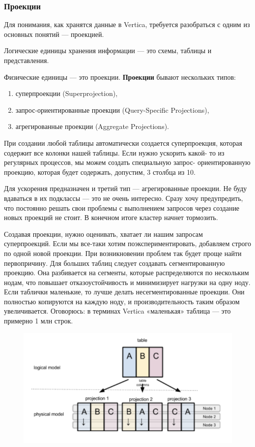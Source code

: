 \subsubsection{Проекции}

Для понимания, как хранятся данные в Vertica, требуется разобраться с
одним из основных понятий — проекцией.

Логические единицы хранения информации — это схемы, таблицы и
представления.

Физические единицы — это проекции. \textbf{Проекции} бывают нескольких типов:

\begin{enumerate}
	\item суперпроекции (Superprojection),
	\item запрос-ориентированные проекции (Query-Specific Projections),
	\item агрегированные проекции (Aggregate Projections).
\end{enumerate}

При создании любой таблицы автоматически создается суперпроекция,
которая содержит все колонки нашей таблицы. Если нужно ускорить какой-
то из регулярных процессов, мы можем создать специальную запрос-
ориентированную проекцию, которая будет содержать, допустим, 3 столбца
из 10.

Для ускорения предназначен и третий тип — агрегированные проекции. Не
буду вдаваться в их подклассы — это не очень интересно. Сразу хочу
предупредить, что постоянно решать свои проблемы с выполнением
запросов через создание новых проекций не стоит. В конечном итоге
кластер начнет тормозить.

Создавая проекции, нужно оценивать, хватает ли нашим запросам
суперпроекций. Если мы все-таки хотим поэкспериментировать, добавляем
строго по одной новой проекции. При возникновении проблем так будет
проще найти первопричину. Для больших таблиц следует создавать
сегментированную проекцию. Она разбивается на сегменты, которые
распределяются по нескольким нодам, что повышает отказоустойчивость и
минимизирует
нагрузки на одну ноду. Если таблички маленькие, то лучше делать
несегментированные
проекции. Они полностью копируются на каждую ноду, и
производительность таким образом увеличивается. Оговорюсь: в терминах
Vertica «маленькая» таблица — это примерно 1 млн строк.

\begin{figure}[ht!]
	\centering
	\includegraphics[width=18cm, keepaspectratio]{assets/MPP-3.png}
	\caption{} 
\end{figure}
\FloatBarrier

